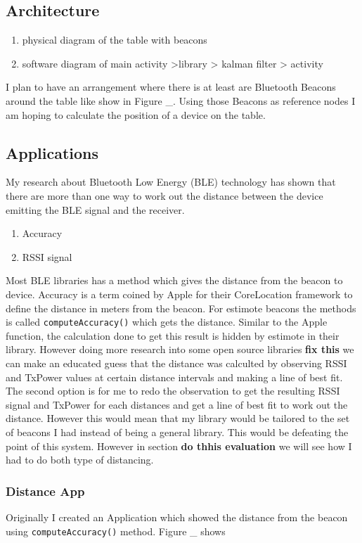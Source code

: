 \subsection{Architecture}
 \begin{enumerate}
 \item physical diagram of the table with beacons
 \item software diagram of main activity \-\->library \-\-> kalman filter \-\-> activity
 \end{enumerate}
 I plan to have an arrangement where there is at least are Bluetooth Beacons around the table like show in Figure \_. Using those Beacons as reference nodes I am hoping to calculate the position of a device on the table.

\subsection{Applications}
My research about Bluetooth Low Energy (BLE) technology has shown that there are more than one way to work out the distance between the device emitting the BLE signal and the receiver. 
\begin{enumerate}
\item Accuracy
\item RSSI signal
\end{enumerate}
Most BLE libraries has a method which gives the distance from the beacon to device. Accuracy is a term coined by Apple for their CoreLocation framework to define the distance in meters from the beacon. For estimote beacons the methods is called  \lstinline|computeAccuracy()| which gets the distance. Similar to the Apple function, the calculation done to get this result is hidden by estimote in their library. However doing more research into some open source libraries \textbf{fix this}\cite{radius-ranging} we can make an educated guess that the distance was calculted by observing RSSI and TxPower values at certain distance intervals and making a line of best fit.
The second option is for me to redo the observation to get the resulting RSSI signal and TxPower for each distances and get a line of best fit to work out the distance. However this would mean that my library would be tailored to the set of beacons I had instead of being a general library. This would be defeating the point of this system. However in section \textbf{do thhis evaluation} we will see how I had to do both type of distancing.

\subsubsection{Distance App}
Originally I created an Application which showed the distance from the beacon using \lstinline|computeAccuracy()| method. Figure _ shows 

